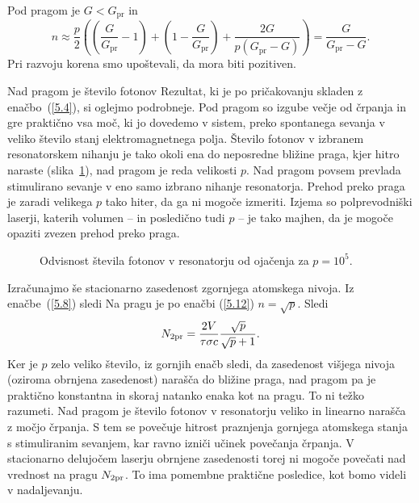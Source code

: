 Pod pragom je $G<G_\mathrm{pr}$ in 
\begin{equation}
n\approx \frac{p}{2}\left( \left(\frac{G}{G_\mathrm{pr}}-1\right)+\left(1
-\frac{G}{G_\mathrm{pr}}\right)+\frac{2G}{p(G_\mathrm{pr}-G)}\right) =\frac{G}{G_\mathrm{pr}-G}.
\label{5.13}
\end{equation}
Pri razvoju korena smo upoštevali, da mora biti pozitiven. 

Nad pragom je
število fotonov 
Rezultat, ki je po pričakovanju skladen z enačbo~(\ref{5.4}), si oglejmo podrobneje. 
Pod pragom so izgube večje od črpanja in gre praktično vsa moč, ki jo dovedemo v sistem, 
preko spontanega sevanja v veliko število stanj elektromagnetnega polja. 
Število fotonov v izbranem resonatorskem nihanju je tako okoli 
ena do neposredne bližine praga, kjer hitro naraste (slika~\ref{fig:p}), nad pragom
je reda velikosti $p$. 
Nad pragom povsem prevlada stimulirano sevanje v eno samo izbrano nihanje resonatorja. 
Prehod preko praga je zaradi velikega $p$ tako hiter, da ga ni mogoče izmeriti.
Izjema so polprevodniški laserji, katerih 
volumen -- in posledično tudi $p$ -- 
je tako majhen, da je mogoče opaziti zvezen prehod preko praga.
\begin{figure}[h]
\centering
\def\svgwidth{50truemm} 

\caption{Odvisnost števila fotonov v resonatorju od ojačenja za $p=10^5$.}
\label{fig:p}
\end{figure}

Izračunajmo še stacionarno zasedenost zgornjega atomskega nivoja. Iz 
enačbe~(\ref{5.8}) sledi
Na pragu je po enačbi (\ref{5.12}) $n=\sqrt{p}$. 
Sledi 
\begin{equation}  
N_{\rm 2pr}=\frac{2V}{\tau \sigma c}\frac{\sqrt{p}}{\sqrt{p}+1}.
\label{5.16}
\end{equation}
Ker je $p$ zelo veliko število, iz gornjih enačb sledi, da zasedenost višjega
nivoja (oziroma obrnjena zasedenost) narašča do bližine praga, nad pragom pa je praktično
konstantna in skoraj natanko enaka kot na pragu. To ni težko razumeti. Nad
pragom je število fotonov v resonatorju veliko in linearno narašča 
z močjo črpanja. S tem se povečuje hitrost praznjenja gornjega atomskega 
stanja s stimuliranim sevanjem, kar ravno izniči učinek povečanja črpanja. 
V stacionarno delujočem laserju obrnjene zasedenosti torej ni mogoče povečati 
nad vrednost na pragu $N_{\rm 2pr}$. To ima pomembne praktične posledice, kot bomo
videli v nadaljevanju.

